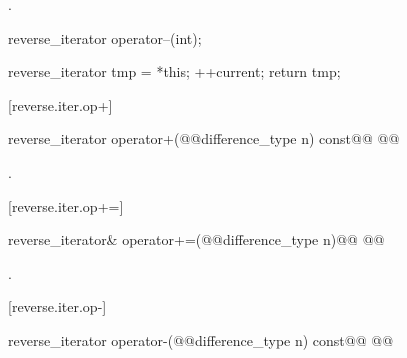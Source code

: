 \begin{itemdescr}
\pnum
\effects
{}

\pnum
\returns
{}.
\end{itemdescr}

%
%
\begin{itemdecl}
reverse_iterator operator--(int);
\end{itemdecl}

\begin{itemdescr}
\pnum
\effects
\begin{codeblock}
reverse_iterator tmp = *this;
++current;
return tmp;
\end{codeblock}
\end{itemdescr}

[reverse.iter.op+]{}

%
\begin{itemdecl}
reverse_iterator
  operator+(@@difference_type n) const@\removed{;}@
    @@
\end{itemdecl}

\begin{itemdescr}
\pnum
\returns
{}.
\end{itemdescr}

[reverse.iter.op+=]{}

%
\begin{itemdecl}
reverse_iterator&
  operator+=(@@difference_type n)@\removed{;}@
    @@
\end{itemdecl}

\begin{itemdescr}
\pnum
\effects
{}

\pnum
\returns
{}.
\end{itemdescr}

[reverse.iter.op-]{}

%
\begin{itemdecl}
reverse_iterator
  operator-(@@difference_type n) const@\removed{;}@
    @@
\end{itemdecl}

